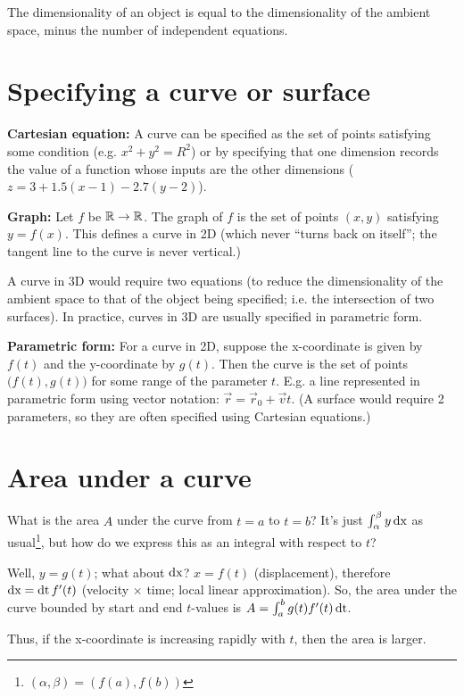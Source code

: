 The dimensionality of an object is equal to the dimensionality of the ambient
space, minus the number of independent equations.

\section{Specifying a curve or surface}

\textbf{Cartesian equation:} A curve can be specified as the set of points
satisfying some condition (e.g. $x^2 + y^2 = R^2$) or by specifying that one
dimension records the value of a function whose inputs are the other
dimensions ($z = 3 + 1.5(x-1) - 2.7(y-2)$).

\textbf{Graph:} Let $f$ be $\mathbb{R} \to \mathbb{R}$. The graph of $f$ is the set of points
$(x,y)$ satisfying $y = f(x)$. This defines a curve in 2D (which never ``turns
back on itself''; the tangent line to the curve is never vertical.)

A curve in 3D would require two equations (to reduce the dimensionality of the
ambient space to that of the object being specified; i.e. the intersection of
two surfaces). In practice, curves in 3D are usually specified in parametric
form.

\textbf{Parametric form:} For a curve in 2D, suppose the x-coordinate is given
by $f(t)$ and the y-coordinate by $g(t)$. Then the curve is the set of points
$\big(f(t), g(t)\big)$ for some range of the parameter $t$. E.g. a line
represented in parametric form using vector notation:
$\vec r = \vec r_0 + \vec v t$. (A surface would require 2 parameters, so they
are often specified using Cartesian equations.)


\section{Area under a curve}

What is the area $A$ under the curve from $t=a$ to $t=b$? It's just
$\int_\alpha^\beta y \operatorname{\text{dx}}$ as usual\footnote{$(\alpha, \beta) = (f(a), f(b))$},
but how do we express this as an integral with respect to $t$?

Well, $y = g(t)$; what about $\operatorname{\text{dx}}$? $x = f(t)$ (displacement), therefore
$\operatorname{\text{dx}} = \operatorname{\text{dt}} f'(t)$ (velocity $\times$ time; local linear approximation). So, the
area under the curve bounded by start and end $t$-values is
$A = \int_a^b g(t) f'(t) \operatorname{\text{dt}}$.

Thus, if the x-coordinate is increasing rapidly with $t$, then the area is
larger.


